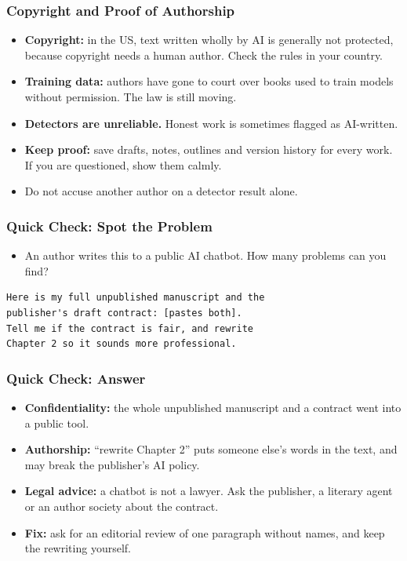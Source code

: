 \begin{frame}[fragile]\frametitle{Copyright and Proof of Authorship}
\begin{itemize}
\item \textbf{Copyright:} in the US, text written wholly by AI is generally not protected, because copyright needs a human author. Check the rules in your country.
\item \textbf{Training data:} authors have gone to court over books used to train models without permission. The law is still moving.
\item \textbf{Detectors are unreliable.} Honest work is sometimes flagged as AI-written.
\item \textbf{Keep proof:} save drafts, notes, outlines and version history for every work. If you are questioned, show them calmly.
\item Do not accuse another author on a detector result alone.
\end{itemize}
\end{frame}

\begin{frame}[fragile]\frametitle{Quick Check: Spot the Problem}
\begin{itemize}
\item An author writes this to a public AI chatbot. How many problems can you find?
\end{itemize}
\begin{lstlisting}[language=HTML]
Here is my full unpublished manuscript and the
publisher's draft contract: [pastes both].
Tell me if the contract is fair, and rewrite
Chapter 2 so it sounds more professional.
\end{lstlisting}
\end{frame}

\begin{frame}[fragile]\frametitle{Quick Check: Answer}
\begin{itemize}
\item \textbf{Confidentiality:} the whole unpublished manuscript and a contract went into a public tool.
\item \textbf{Authorship:} ``rewrite Chapter 2'' puts someone else's words in the text, and may break the publisher's AI policy.
\item \textbf{Legal advice:} a chatbot is not a lawyer. Ask the publisher, a literary agent or an author society about the contract.
\item \textbf{Fix:} ask for an editorial review of one paragraph without names, and keep the rewriting yourself.
\end{itemize}
\end{frame}
